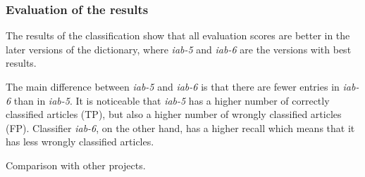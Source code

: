 \subsubsection{Evaluation of the results}
The results of the classification show that all evaluation scores are better in the later versions of the dictionary, where \emph{iab-5} and \emph{iab-6} are the versions with best results. 

The main difference between \emph{iab-5} and \emph{iab-6} is that there are fewer entries in \emph{iab-6} than in \emph{iab-5}. It is noticeable that \emph{iab-5} has a higher number of correctly classified articles (TP), but also a higher number of wrongly classified articles (FP). Classifier \emph{iab-6}, on the other hand, has a higher recall which means that it has less wrongly classified articles. 




Comparison with other projects. 


